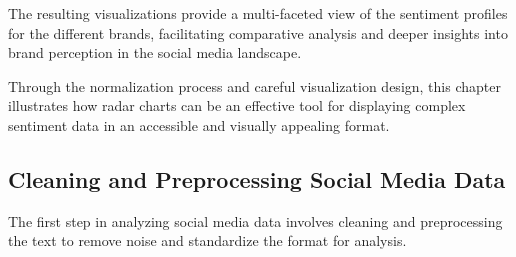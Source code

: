 \documentclass[
]{book}
\begin{document}
The resulting visualizations provide a multi-faceted view of the sentiment profiles for the different brands, facilitating comparative analysis and deeper insights into brand perception in the social media landscape.

Through the normalization process and careful visualization design, this chapter illustrates how radar charts can be an effective tool for displaying complex sentiment data in an accessible and visually appealing format.

\hypertarget{cleaning-and-preprocessing-social-media-data}{%
\subsection*{Cleaning and Preprocessing Social Media Data}\label{cleaning-and-preprocessing-social-media-data}}

The first step in analyzing social media data involves cleaning and preprocessing the text to remove noise and standardize the format for analysis.
\end{document}
